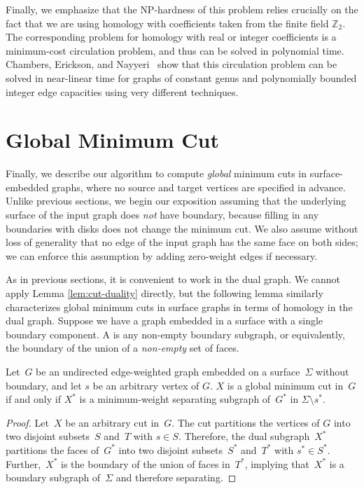 \documentclass[letterpaper,review]{siamart190516}
\def\Z{\mathbb{Z}}
\def\Cut{X}
\begin{document}
{Finally, we emphasize that the {NP}-hardness of this problem relies crucially on the fact that we are using homology with coefficients taken from the finite field $\Z_2$.  The corresponding problem for homology with real or integer coefficients is a minimum-cost circulation problem, and thus can be solved in polynomial time.
Chambers, Erickson, and Nayyeri~\cite{cen-hfcc-12} show that this circulation problem can be solved in near-linear time for graphs of constant genus and polynomially bounded integer edge capacities using very different techniques.


\def\minSS{X}

\section{Global Minimum Cut}
\label{sec:global}

Finally, we describe our algorithm to compute \emph{global} minimum cuts in surface-embedded graphs, where no source and target vertices are specified in advance.  
Unlike previous sections, we begin our exposition assuming that the underlying surface of the input
graph does \emph{not} have boundary, because filling in any boundaries with disks does not change
the minimum cut.
We also assume without loss of generality that no edge of the input graph has the same face on both
sides; we can enforce this assumption by adding zero-weight edges if necessary.

As in previous sections, it is convenient to work in the dual graph.  We cannot apply Lemma \ref{lem:cut-duality} directly, but the following lemma similarly characterizes global minimum cuts in surface graphs in terms of homology in the dual graph.
Suppose we have a graph embedded in a surface with a single boundary component.
A  is any non-empty boundary subgraph, or equivalently, the boundary of the union of a \emph{non-empty} set of faces.

\begin{lemma}
\label{lem:mincut-z2}
Let~$G$ be an undirected edge-weighted graph embedded on a surface~$\Sigma$ without boundary, and
let $s$ be an arbitrary vertex of $G$.
$\Cut$ is a global minimum cut in~$G$ if and only if $\Cut^*$ is a minimum-weight separating subgraph
of~$G^*$ in $\Sigma \setminus s^*$.
\end{lemma}

\begin{proof}
  Let~$\Cut$ be an arbitrary cut in~$G$.  The cut partitions the vertices of $G$
  into two disjoint subsets~$S$ and~$T$ with $s \in S$.
  Therefore, the dual subgraph~$\Cut^*$
  partitions the faces of~$G^*$ into two disjoint subsets~$S^*$ and~$T^*$ with $s^* \in S^*$.
  Further,~$\Cut^*$ is the boundary of the union of faces in~$T^*$, implying
  that~$\Cut^*$ is a boundary subgraph of~$\Sigma$ and therefore separating.


\end{proof}}
\end{document}

